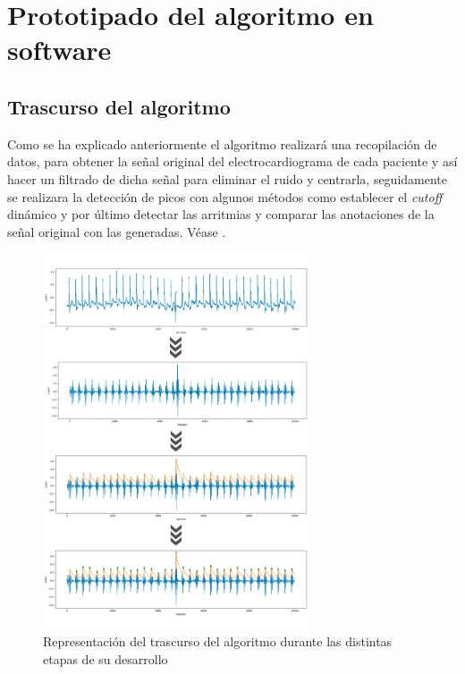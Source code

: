 \chapter{Prototipado del algoritmo en software}

\section{Trascurso del algoritmo}
Como se ha explicado anteriormente el algoritmo realizará una recopilación de datos, para obtener 
la señal original del electrocardiograma de cada paciente y así hacer un filtrado de dicha señal para eliminar
 el ruido y centrarla, seguidamente se realizara la detección de picos con algunos métodos como establecer 
 el \textit{cutoff} dinámico y por último detectar las arritmias y comparar las anotaciones de la señal original con las generadas.
 Véase
  .

\begin{figure}[h!]
    \centering
    \includegraphics[width=0.7\textwidth]{./Images/img_algoritmo/esquemaGeneral.jpg}
    \caption[Representación del trascurso del prototipo]{Representación del trascurso del algoritmo durante las distintas etapas de su desarrollo}
    \label{fig:esquemaGeneral}
\end{figure}

